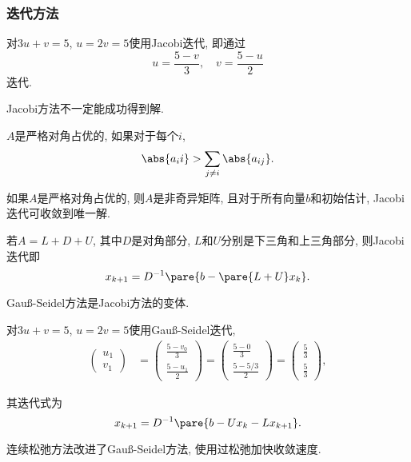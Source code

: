 \documentclass{ctexart}
\begin{document}

\subsubsection{迭代方法} %
\label{ssub:迭代方法}

\begin{ex}
    对$3u+v=5$, $u=2v=5$使用Jacobi迭代, 即通过
    \[ u = \frac{5-v}{3},\quad v = \frac{5-u}{2} \]
    迭代.
\end{ex}
Jacobi方法不一定能成功得到解.
\begin{definition}
    $A$是严格对角占优的, 如果对于每个$i$,
    \[ \abs{a_ii} > \sum_{j\neq i} \abs{a_{ij}}. \]
\end{definition}
\begin{theorem}
    如果$A$是严格对角占优的, 则$A$是非奇异矩阵, 且对于所有向量$b$和初始估计, Jacobi迭代可收敛到唯一解.
\end{theorem}
若$A=L+D+U$, 其中$D$是对角部分, $L$和$U$分别是下三角和上三角部分, 则Jacobi迭代即
\[ x_{k+1} = D^{-1} \pare{b-\pare{L+U}x_k}. \]
\par
Gau\ss-Seidel方法是Jacobi方法的变体.
\begin{ex}
    对$3u+v=5$, $u=2v=5$使用Gau\ss-Seidel迭代,
    \begin{align*}
        \begin{pmatrix}
            u_1 \\ v_1
        \end{pmatrix} &= \begin{pmatrix}
            \displaystyle \frac{5-v_0}{3} \\[1em] \displaystyle \frac{5-u_1}{2}
        \end{pmatrix} = \begin{pmatrix}
            \displaystyle \frac{5-0}{3} \\[1em] \displaystyle \frac{5-5/3}{2}
        \end{pmatrix} = \begin{pmatrix}
            \displaystyle \frac{5}{3} \\[1em] \displaystyle \frac{5}{3}
        \end{pmatrix},
    \end{align*}
\end{ex}
其迭代式为
\[ x_{k+1} = D^{-1}\pare{b-Ux_k - Lx_{k+1}}. \]
\par
连续松弛方法改进了Gau\ss-Seidel方法, 使用过松弛加快收敛速度.
\end{document}
